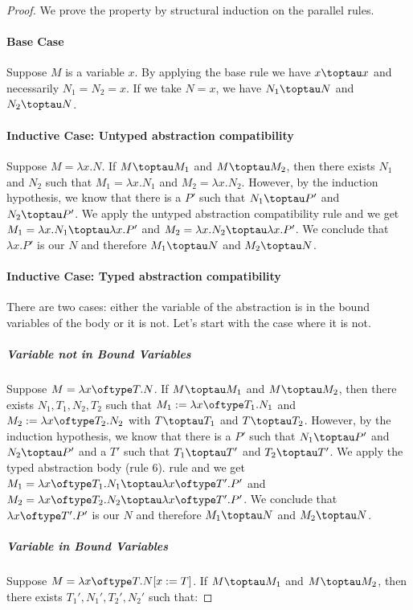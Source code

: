 \begin{proof}
We prove the property by structural induction on the parallel \taureduction rules.

\paragraph{Base Case}
Suppose $M$ is a variable $x$. By applying the base rule we have $x \toptau x$ and necessarily $N_1=N_2=x$. If we take $N=x$, we have $N_1 \toptau N$ and $N_2 \toptau N$.

\paragraph{Inductive Case: Untyped abstraction compatibility}
Suppose $M=\lambda x.N$. If $M \toptau M_1$ and $M \toptau M_2$, then there exists $N_1$ and $N_2$ such that $M_1=\lambda x.N_1$ and $M_2=\lambda x.N_2$. However, by the induction hypothesis, we know that there is a $P'$ such that $N_1 \toptau P'$ and $N_2 \toptau P'$. We apply the untyped abstraction compatibility rule and we get $M_1=\lambda x.N_1 \toptau \lambda x.P'$ and $M_2=\lambda x.N_2 \toptau \lambda x.P'$. We conclude that $\lambda x.P'$ is our $N$ and therefore $M_1 \toptau N$ and $M_2 \toptau N$.

\paragraph{Inductive Case: Typed abstraction compatibility}
There are two cases: either the variable of the abstraction is in the bound variables of the body or it is not. Let's start with the case where it is not.

\subparagraph{Variable not in Bound Variables}
Suppose $M=\lambda x \oftype T.N$. If $M \toptau M_1$ and $M \toptau M_2$, then there exists $N_1, T_1, N_2, T_2$ such that $M_1:=\lambda x \oftype T_1.N_1$ and $M_2:=\lambda x \oftype T_2.N_2$ with $T \toptau T_1$ and $T \toptau T_2$. However, by the induction hypothesis, we know that there is a $P'$ such that $N_1 \toptau P'$ and $N_2 \toptau P'$ and a $T'$ such that $T_1 \toptau T'$ and $T_2 \toptau T'$. We apply the typed abstraction body (rule 6). rule and we get $M_1=\lambda x \oftype T_1.N_1 \toptau \lambda x \oftype T'.P'$ and $M_2=\lambda x \oftype T_2.N_2 \toptau \lambda x \oftype T'.P'$. We conclude that $\lambda x \oftype T'.P'$ is our $N$ and therefore $M_1 \toptau N$ and $M_2 \toptau N$.

\subparagraph{Variable in Bound Variables}
    Suppose $M=\lambda x \oftype T.N[x := T]$. If $M \toptau M_1$ and $M \toptau M_2$, then there exists $T_1', N_1', T_2', N_2'$ such that:


\end{proof}
